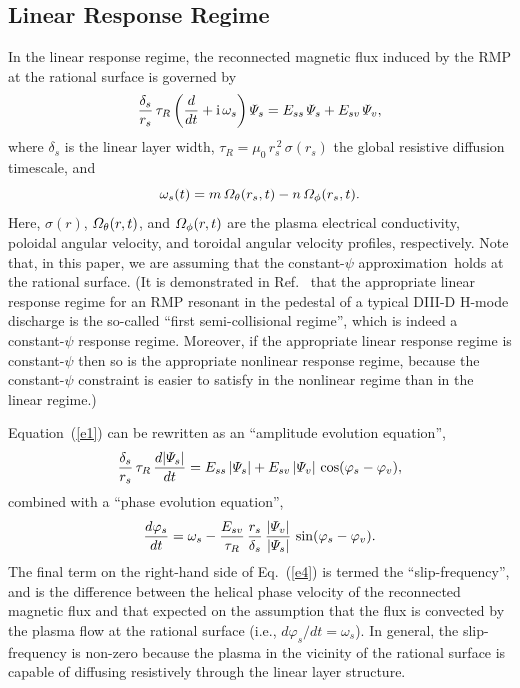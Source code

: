 \documentclass[12pt,prb,aps]{revtex4-1}
\begin{document}
\subsection{Linear Response Regime}
In the linear response regime, the reconnected magnetic flux induced by the RMP at the
rational surface is governed by\,\cite{rfa,rfb,rfc}
\begin{equation}\label{e1}
\frac{\delta_s}{r_s}\,\tau_R\left(\frac{d}{dt}+{\rm i}\,\omega_s\right){\mit\Psi}_s= E_{ss}\,{\mit\Psi}_s+E_{sv}\,{\mit\Psi}_v,
\end{equation}
where $\delta_s$ is the linear layer width, $\tau_R=\mu_0\,r_s^{\,2}\,\sigma(r_s)$ the global resistive diffusion timescale,
 and
\begin{equation}
\omega_s (t)=m\,{\mit\Omega}_\theta(r_s,t)-n\,{\mit\Omega}_\phi(r_s,t).
\end{equation}
Here, $\sigma(r)$, ${\mit\Omega}_\theta(r,t)$, and ${\mit\Omega}_\phi(r,t)$ are the 
plasma electrical conductivity, poloidal angular velocity, and toroidal angular velocity profiles, respectively. 
Note that, in this paper, we are assuming that the constant-$\psi$ approximation\,\cite{fkr} holds at the rational surface. (It is demonstrated in
Ref.~ that the appropriate linear response regime for an RMP resonant in the pedestal of a typical DIII-D H-mode discharge
is the so-called  ``first semi-collisional regime'', which is indeed a constant-$\psi$ response regime. Moreover, if the appropriate linear response regime
is constant-$\psi$ then so is the appropriate nonlinear response regime, because the constant-$\psi$ constraint is
easier to satisfy in the nonlinear regime than in the linear regime.\cite{rfb,rffig})

Equation~(\ref{e1}) can be rewritten as an ``amplitude evolution equation'',
\begin{equation}\label{e3}
\frac{\delta_s}{r_s}\,\tau_R\,\frac{d|{\mit\Psi}_s|}{dt}= E_{ss}\,|{\mit\Psi}_s| + E_{sv}\,|{\mit\Psi}_v|\,\cos(\varphi_s-\varphi_v),
\end{equation}
combined with a ``phase evolution equation'', 
\begin{equation}\label{e4}
\frac{d\varphi_s}{dt} = \omega_s - \frac{E_{sv}}{\tau_R}\,\frac{r_s}{\delta_s}\,\frac{|{\mit\Psi}_v|}{|{\mit\Psi}_s|}\,\sin(\varphi_s-\varphi_v).
\end{equation}
The final term on the right-hand side of Eq.~(\ref{e4}) is termed the ``slip-frequency'', and is the difference between the helical phase velocity of
the reconnected magnetic flux and that expected on the  assumption that the flux is convected by the plasma flow at the
rational surface (i.e., $d\varphi_s/dt=\omega_s$). In general, the slip-frequency is non-zero because the plasma in the vicinity of the rational surface is capable of diffusing resistively 
through the linear layer structure. 
\end{document}
